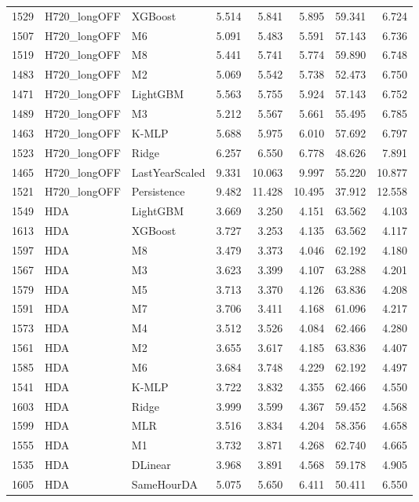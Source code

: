 \begin{tabular}{lllrrrrr}
1529 & H720_longOFF & XGBoost & 5.514 & 5.841 & 5.895 & 59.341 & 6.724 \\
1507 & H720_longOFF & M6 & 5.091 & 5.483 & 5.591 & 57.143 & 6.736 \\
1519 & H720_longOFF & M8 & 5.441 & 5.741 & 5.774 & 59.890 & 6.748 \\
1483 & H720_longOFF & M2 & 5.069 & 5.542 & 5.738 & 52.473 & 6.750 \\
1471 & H720_longOFF & LightGBM & 5.563 & 5.755 & 5.924 & 57.143 & 6.752 \\
1489 & H720_longOFF & M3 & 5.212 & 5.567 & 5.661 & 55.495 & 6.785 \\
1463 & H720_longOFF & K-MLP & 5.688 & 5.975 & 6.010 & 57.692 & 6.797 \\
1523 & H720_longOFF & Ridge & 6.257 & 6.550 & 6.778 & 48.626 & 7.891 \\
1465 & H720_longOFF & LastYearScaled & 9.331 & 10.063 & 9.997 & 55.220 & 10.877 \\
1521 & H720_longOFF & Persistence & 9.482 & 11.428 & 10.495 & 37.912 & 12.558 \\
1549 & HDA & LightGBM & 3.669 & 3.250 & 4.151 & 63.562 & 4.103 \\
1613 & HDA & XGBoost & 3.727 & 3.253 & 4.135 & 63.562 & 4.117 \\
1597 & HDA & M8 & 3.479 & 3.373 & 4.046 & 62.192 & 4.180 \\
1567 & HDA & M3 & 3.623 & 3.399 & 4.107 & 63.288 & 4.201 \\
1579 & HDA & M5 & 3.713 & 3.370 & 4.126 & 63.836 & 4.208 \\
1591 & HDA & M7 & 3.706 & 3.411 & 4.168 & 61.096 & 4.217 \\
1573 & HDA & M4 & 3.512 & 3.526 & 4.084 & 62.466 & 4.280 \\
1561 & HDA & M2 & 3.655 & 3.617 & 4.185 & 63.836 & 4.407 \\
1585 & HDA & M6 & 3.684 & 3.748 & 4.229 & 62.192 & 4.497 \\
1541 & HDA & K-MLP & 3.722 & 3.832 & 4.355 & 62.466 & 4.550 \\
1603 & HDA & Ridge & 3.999 & 3.599 & 4.367 & 59.452 & 4.568 \\
1599 & HDA & MLR & 3.516 & 3.834 & 4.204 & 58.356 & 4.658 \\
1555 & HDA & M1 & 3.732 & 3.871 & 4.268 & 62.740 & 4.665 \\
1535 & HDA & DLinear & 3.968 & 3.891 & 4.568 & 59.178 & 4.905 \\
1605 & HDA & SameHourDA & 5.075 & 5.650 & 6.411 & 50.411 & 6.550 \\

\end{tabular}
